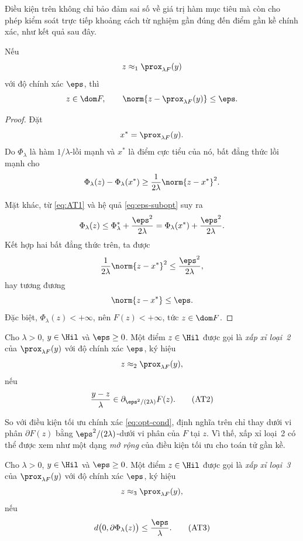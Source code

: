 Điều kiện trên không chỉ bảo đảm sai số về giá trị hàm mục tiêu mà còn cho
phép kiểm soát trực tiếp khoảng cách từ nghiệm gần đúng đến điểm gần kề
chính xác, như kết quả sau đây.

\begin{proposition}
\label{prop:type1-bound}
Nếu
\[
z\approx_1\prox_{\lambda F}(y)
\]
với độ chính xác $\eps$, thì
\[
z\in\dom F,
\qquad
\norm{z-\prox_{\lambda F}(y)}
\le
\eps.
\]
\end{proposition}

\begin{proof}
Đặt
\[
x^*=\prox_{\lambda F}(y).
\]
Do $\Phi_\lambda$ là hàm $1/\lambda$-lồi mạnh và $x^*$ là điểm cực tiểu của
nó, bất đẳng thức lồi mạnh cho
\[
\Phi_\lambda(z)-\Phi_\lambda(x^*)
\ge
\frac1{2\lambda}\norm{z-x^*}^2.
\]

Mặt khác, từ \eqref{eq:AT1} và hệ quả
\eqref{eq:eps-subopt} suy ra
\[
\Phi_\lambda(z)
\le
\Phi_\lambda^*
+
\frac{\eps^2}{2\lambda}
=
\Phi_\lambda(x^*)
+
\frac{\eps^2}{2\lambda}.
\]
Kết hợp hai bất đẳng thức trên, ta được
\[
\frac1{2\lambda}\norm{z-x^*}^2
\le
\frac{\eps^2}{2\lambda},
\]
hay tương đương
\[
\norm{z-x^*}\le\eps.
\]
Đặc biệt,
$\Phi_\lambda(z)<+\infty$, nên $F(z)<+\infty$, tức
$z\in\dom F$.
\end{proof}

\begin{definition}
Cho $\lambda>0$, $y\in\Hil$ và $\eps\ge0$. Một điểm
$z\in\Hil$ được gọi là \emph{xấp xỉ loại~2} của
$\prox_{\lambda F}(y)$ với độ chính xác $\eps$, ký hiệu
\[
z\approx_2\prox_{\lambda F}(y),
\]
nếu
\begin{equation}
\frac{y-z}{\lambda}
\in
\partial_{\eps^2/(2\lambda)}F(z).
\tag{AT2}
\label{eq:AT2}
\end{equation}
\end{definition}

So với điều kiện tối ưu chính xác
\eqref{eq:opt-cond}, định nghĩa trên chỉ thay dưới vi phân
$\partial F(z)$ bằng $\eps^2/(2\lambda)$-dưới vi phân của $F$ tại $z$. Vì thế, xấp xỉ loại~2 có thể được xem như một dạng \emph{mở rộng} của điều kiện tối ưu cho toán tử gần kề.

\begin{definition}
Cho $\lambda>0$, $y\in\Hil$ và $\eps\ge0$. Một điểm
$z\in\Hil$ được gọi là \emph{xấp xỉ loại~3} của
$\prox_{\lambda F}(y)$ với độ chính xác $\eps$, ký hiệu
\[
z\approx_3\prox_{\lambda F}(y),
\]
nếu
\begin{equation}
d\bigl(0,\partial\Phi_\lambda(z)\bigr)
\le
\frac{\eps}{\lambda}.
\tag{AT3}
\label{eq:AT3}
\end{equation}
\end{definition}

